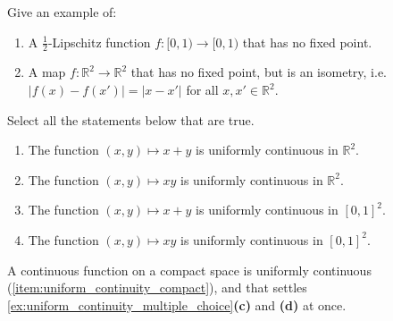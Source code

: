 

\begin{exercise}
\label{ex:lipschitz_or_not}
Give an example of:
\begin{enumerate}[label=\textbf{(\alph*)}]
  \item A $\tfrac{1}{2}$-Lipschitz function $f : [0,1) \to [0,1)$ that has no fixed point.
  \item A map $f : \mathbb{R}^2 \to \mathbb{R}^2$ that has no fixed point, but is an isometry,
    i.e.\ $|f(x) - f(x')| = |x - x'|$ for all $x, x' \in \mathbb{R}^2$.
\end{enumerate}
\end{exercise}


\begin{exercise}
\label{ex:uniform_continuity_multiple_choice}
Select all the statements below that are true.
\begin{enumerate}[label=\textbf{(\alph*)}]
  \item The function $(x,y) \mapsto x+y$ is uniformly continuous in $\mathbb{R}^2$.
  \item The function $(x,y) \mapsto xy$ is uniformly continuous in $\mathbb{R}^2$.
  \item The function $(x,y) \mapsto x+y$ is uniformly continuous in $[0,1]^2$.
  \item The function $(x,y) \mapsto xy$ is uniformly continuous in $[0,1]^2$.
\end{enumerate}
\end{exercise}

\begin{remark}
A continuous function on a compact space is uniformly continuous
(\cref{item:uniform_continuity_compact}), and that settles
\cref{ex:uniform_continuity_multiple_choice}\textbf{(c)} and \textbf{(d)} at once.
\end{remark}

